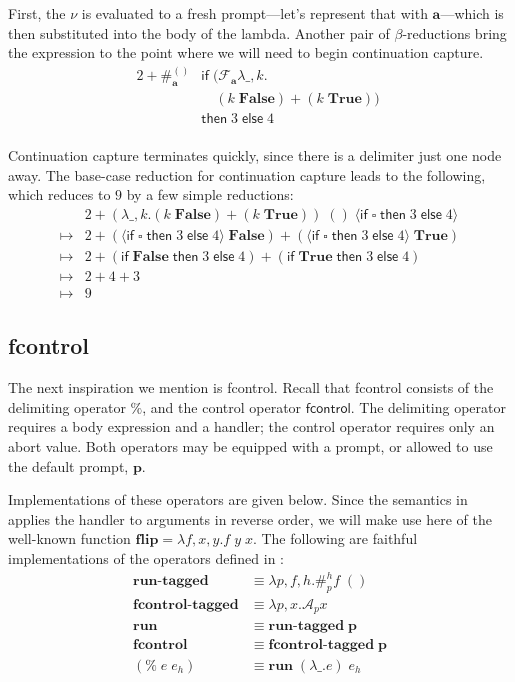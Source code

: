 \documentclass[11pt]{article}
\newcommand{\maybePage}{\newpage}
\newcommand\F{\mathcal{F}}
\newcommand\A{\mathcal{A}}
\newcommand{\angles}[1]{\langle#1\rangle}
\begin{document}
First, the $\nu$ is evaluated to a fresh prompt---let's represent that with $\mathbf{a}$---which is then substituted into the body of the lambda.
Another pair of $\beta$-reductions bring the expression to the point where we will need to begin continuation capture.
\begin{align*}
2 + \#_\mathbf{a}^{()} &\mathsf{if}\;(\F_\mathbf{a}\lambda \_,k. \\
&\quad (k\;\mathbf{False}) + (k\;\mathbf{True}))\; \\
&\mathsf{then}\;3\;\mathsf{else}\;4 \\
\end{align*}

Continuation capture terminates quickly, since there is a delimiter just one node away.
The base-case reduction for continuation capture leads to the following, which reduces to $9$ by a few simple reductions:
\begin{align*}
& 2 +
	(\lambda \_,k. (k\;\mathbf{False}) + (k\;\mathbf{True}))
	\;()
	\;\angles{\mathsf{if}\;\square\;\mathsf{then}\;3\;\mathsf{else}\;4} \\
\mapsto{} & 2 +
	(\angles{\mathsf{if}\;\square\;\mathsf{then}\;3\;\mathsf{else}\;4}\;\mathbf{False})
	+ (\angles{\mathsf{if}\;\square\;\mathsf{then}\;3\;\mathsf{else}\;4}\;\mathbf{True}) \\
\mapsto{} & 2 + (\mathsf{if}\;\mathbf{False}\;\mathsf{then}\;3\;\mathsf{else}\;4) + (\mathsf{if}\;\mathbf{True}\;\mathsf{then}\;3\;\mathsf{else}\;4) \\
\mapsto{} & 2 + 4 + 3 \\
\mapsto{} & 9
\end{align*}


\maybePage
\subsection{fcontrol}

The next inspiration we mention is fcontrol.
Recall that fcontrol consists of the delimiting operator $\%$, and the control operator $\mathsf{fcontrol}$.
The delimiting operator requires a body expression and a handler; the control operator requires only an abort value.
Both operators may be equipped with a prompt, or allowed to use the default prompt, $\mathbf{p}$.

Implementations of these operators are given below.
Since the semantics in \cite{HandlingControl} applies the handler to arguments in reverse order, we will make use here of the well-known function $\mathbf{flip} = \lambda f,x,y. f\;y\;x$.
The following are faithful implementations of the operators defined in \cite{HandlingControl}:
\begin{align*}
\textbf{run-tagged} &\equiv \lambda p,f,h. \#_p^h f\;() \\
\textbf{fcontrol-tagged} &\equiv \lambda p,x. \A_p x \\
\textbf{run} &\equiv \textbf{run-tagged}\;\mathbf{p} \\
\mathbf{fcontrol} &\equiv \textbf{fcontrol-tagged}\;\mathbf{p} \\
(\%\;e\;e_h) &\equiv \textbf{run}\;(\lambda \_.e)\;e_h \\
\end{align*}
\end{document}

